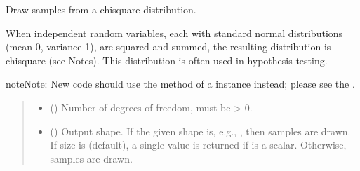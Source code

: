 \documentclass[letterpaper,10pt,english]{sphinxmanual}
\begin{document}

\begin{fulllineitems}
\label{\detokenize{metilda.controllers:metilda.controllers.pitch_art_wizard.chisquare}}
\pysigstartsignatures
{}
\pysigstopsignatures
\sphinxAtStartPar
Draw samples from a chi\sphinxhyphen{}square distribution.

\sphinxAtStartPar
When  independent random variables, each with standard normal
distributions (mean 0, variance 1), are squared and summed, the
resulting distribution is chi\sphinxhyphen{}square (see Notes).  This distribution
is often used in hypothesis testing.

\begin{sphinxadmonition}{note}{Note:}
\sphinxAtStartPar
New code should use the 
method of a  instance instead;
please see the .
\end{sphinxadmonition}
\begin{quote}\begin{description}
\begin{itemize}
\item {} 
\sphinxAtStartPar
{} () \textendash{} Number of degrees of freedom, must be \textgreater{} 0.

\item {} 
\sphinxAtStartPar
{} (\sphinxstyleliteralemphasis{\sphinxupquote{, }}) \textendash{} Output shape.  If the given shape is, e.g., , then
 samples are drawn.  If size is  (default),
a single value is returned if  is a scalar.  Otherwise,
 samples are drawn.


\end{itemize}
\end{description}
\end{quote}
\end{fulllineitems}
\end{document}
